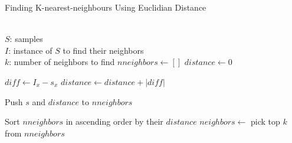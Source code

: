 \documentclass{beamer}
\begin{document}
\begin{frame}
	{Finding K-nearest-neighbours}
	{Using Euclidian Distance}
	\footnotesize
	\begin{algorithmic}[1]
		\Require \\
		$ S $: samples \\
		$ I $: instance of $S$ to find their neighbors \\
		$ k $: number of neighbors to find
			\State $ nneighbors \gets [] $
				\State $ distance \gets 0 $

					\State $ diff \gets I_{x} - s_{x} $
					\State $ distance \gets distance + |diff| $
				\EndFor

				\State Push $s$ and $distance$ to $nneighbors$
			\EndFor

			\State Sort $nneighbors$ in ascending order by their $distance$
			\State $neighbors \gets $ pick top $k$ from $nneighbors$
			\State {}
		\EndFunction
	\end{algorithmic}
\end{frame}
\end{document}
